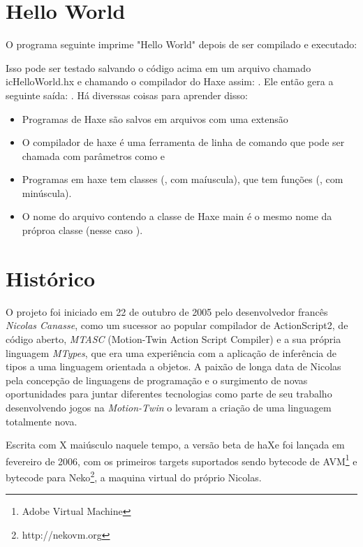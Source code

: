 \section{Hello World}
\label{introduction-hello-world}

O programa seguinte imprime "Hello World" depois de ser compilado e executado:


Isso pode ser testado salvando o código acima em um arquivo chamado ic{HelloWorld.hx} e chamando o compilador do Haxe assim: . Ele então gera a seguinte saída: . Há diverssas coisas para aprender disso:

\begin{itemize}
	\item Programas de Haxe são salvos em arquivos com uma extensão 
	\item O compilador de haxe é uma ferramenta de linha de comando que pode ser chamada com parâmetros como  e 
	\item Programas em haxe tem classes (, com maíuscula), que tem funções (, com minúscula).
	\item O nome do arquivo contendo a classe de Haxe main é o mesmo nome da próproa classe (nesse caso ).
\end{itemize}

\section{Histórico}
\label{introduction-haxe-history}

O projeto foi iniciado em 22 de outubro de 2005 pelo desenvolvedor francês \emph{Nicolas Canasse}, como um sucessor ao popular compilador de ActionScript2, de código aberto, \emph{MTASC} (Motion-Twin Action Script Compiler) e a sua própria linguagem \emph{MTypes}, que era uma experiência com a aplicação de inferência de tipos a uma linguagem orientada a objetos. A paixão de longa data de Nicolas pela concepção de linguagens de programação e o surgimento de novas oportunidades para juntar diferentes tecnologias como parte de seu trabalho desenvolvendo jogos na \emph{Motion-Twin} o levaram a criação de uma linguagem totalmente nova.

Escrita com X maiúsculo naquele tempo, a versão beta de haXe foi lançada em fevereiro de 2006, com os primeiros targets suportados sendo bytecode de AVM\footnote{Adobe Virtual Machine} e bytecode para Neko\footnote{http://nekovm.org}, a maquina virtual do próprio Nicolas.

